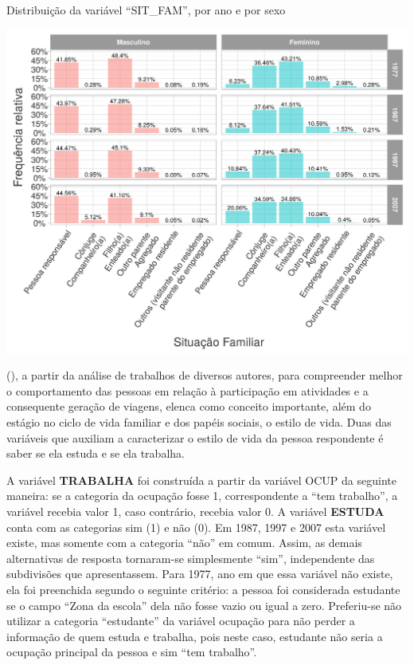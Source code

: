 \begin{grafico}[htb]%
    \caption{\label{graf:distr-sit-fam}Distribuição da variável ``SIT_FAM'', por ano e por sexo}%
    \begin{center}%
        \includegraphics[width=1\textwidth]{./imagens/sit-fam.png}%
    \end{center}%
\end{grafico}%

 (\citeyear{BILT1997}), a partir da análise de trabalhos de diversos autores, para compreender melhor o comportamento das pessoas em relação à participação em atividades e a consequente geração de viagens, 
elenca como conceito importante, além do estágio no ciclo de vida familiar e dos papéis sociais, o estilo de vida.
Duas das variáveis que auxiliam a caracterizar o estilo de vida da pessoa respondente é saber se ela estuda e se ela trabalha.

A variável \textbf{TRABALHA} foi construída a partir da variável OCUP da seguinte maneira: se a categoria da ocupação fosse 1, correspondente a ``tem trabalho'', a variável recebia valor 1, caso contrário, recebia valor 0.
A variável \textbf{ESTUDA} conta com as categorias sim (1) e não (0). Em 1987, 1997 e 2007 esta variável existe, mas somente com a categoria ``não'' em comum. Assim, as demais alternativas de resposta tornaram-se simplesmente ``sim'', independente das subdivisões que apresentassem. Para 1977, ano em que essa variável não existe, ela foi preenchida segundo o seguinte critério: a pessoa foi considerada estudante se o campo ``Zona da escola'' dela não fosse vazio ou igual a zero. Preferiu-se não utilizar a categoria ``estudante'' da variável ocupação para não perder a informação de quem estuda e trabalha, pois neste caso, estudante não seria a ocupação principal da pessoa e sim ``tem trabalho''.

